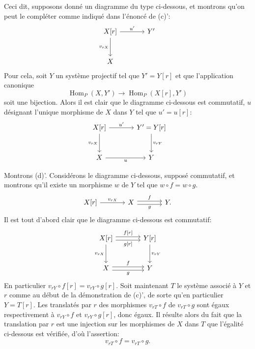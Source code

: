 \documentclass[11pt]{article}
\DeclareMathOperator{\Hom}{Hom}
\providecommand{\Hom}{\operatorname{Hom}}
\providecommand{\Hom}{\operatorname{Hom}}
\begin{document}
Ceci dit, supposons donné un diagramme du type ci-dessous, et montrons qu'on peut le compléter comme indiqué dans l'énoncé de (c)':
\[
\begin{tikzcd}[column sep=large,row sep=large]
X[r] \arrow[r,"u'"] \arrow[d,"{v_{rX}}"'] & Y'\\
X
\end{tikzcd}
\]
Pour cela, soit $Y$ un système projectif tel que $Y'=Y[r]$ et que l'application canonique
\[
\Hom_P(X,Y')\longrightarrow\Hom_P(X[r],Y')
\]
soit une bijection. Alors il est clair que le diagramme ci-dessous est commutatif, $u$ désignant l'unique morphisme de $X$ dans $Y$ tel que $u'=u[r]$:
\[
\begin{tikzcd}[column sep=large,row sep=large]
X[r] \arrow[r,"u'"] \arrow[d,"{v_{rX}}"'] & Y'=Y[r] \arrow[d,"{v_{rY}}"]\\
X \arrow[r,"u"'] & Y
\end{tikzcd}
\]

Montrons (d)'. Considérons le diagramme ci-dessous, supposé commutatif, et montrons qu'il existe un morphisme $w$ de $Y$ tel que $w\circ f=w\circ g$.
\[
\begin{tikzcd}[column sep=large]
X[r] \arrow[r,"{v_{rX}}"] & X \arrow[r,shift left,"f"] \arrow[r,shift right,"g"'] & Y .
\end{tikzcd}
\]
Il est tout d'abord clair que le diagramme ci-dessous est commutatif:
\[
\begin{tikzcd}[column sep=large,row sep=large]
X[r] \arrow[r,shift left,"{f[r]}"] \arrow[r,shift right,"{g[r]}"'] \arrow[d,"{v_{rX}}"'] & Y[r] \arrow[d,"{v_{rY}}"]\\
X \arrow[r,shift left,"f"] \arrow[r,shift right,"g"'] & Y
\end{tikzcd}
\]
En particulier $v_{rY}\circ f[r]=v_{rY}\circ g[r]$. Soit maintenant $T$ le système associé à $Y$ et $r$ comme au début de la démonstration de (c)', de sorte qu'en
particulier $Y=T[r]$. Les translatés par $r$ des morphismes $v_{rT}\circ f$ de $v_{rT}\circ g$ sont égaux respectivement à $v_{rY}\circ f$ et $v_{rY}\circ g[r]$, donc égaux. Il résulte alors du fait que la translation par $r$ est une injection sur les morphismes de $X$ dans $T$ que l'égalité ci-dessous est vérifiée, d'où l'assertion:
\[
v_{rT}\circ f=v_{rT}\circ g.
\]
\end{document}

